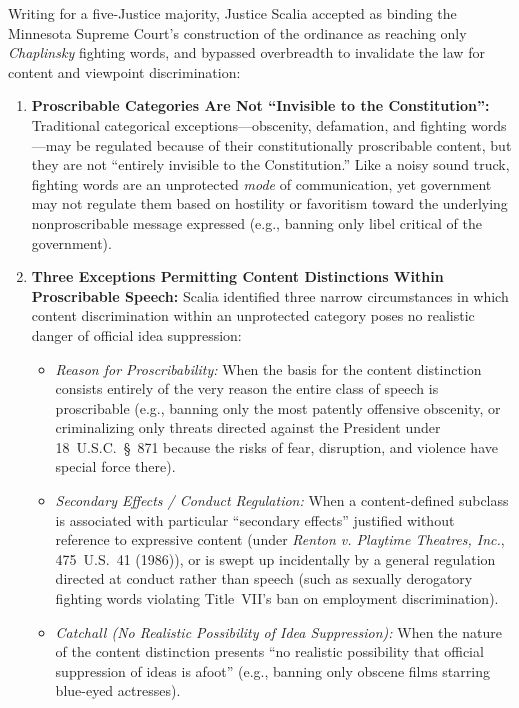 \documentclass[12pt]{article}
\begin{document}
Writing for a five-Justice majority, Justice Scalia accepted as binding the Minnesota Supreme Court's construction of the ordinance as reaching only \textit{Chaplinsky} fighting words, and bypassed overbreadth to invalidate the law for content and viewpoint discrimination:
\begin{enumerate}
  \item \textbf{Proscribable Categories Are Not ``Invisible to the Constitution'':} Traditional categorical exceptions---obscenity, defamation, and fighting words---may be regulated because of their constitutionally proscribable content, but they are not ``entirely invisible to the Constitution.'' Like a noisy sound truck, fighting words are an unprotected \textit{mode} of communication, yet government may not regulate them based on hostility or favoritism toward the underlying nonproscribable message expressed (e.g., banning only libel critical of the government).
  \item \textbf{Three Exceptions Permitting Content Distinctions Within Proscribable Speech:} Scalia identified three narrow circumstances in which content discrimination within an unprotected category poses no realistic danger of official idea suppression:
  \begin{itemize}
    \item \textit{Reason for Proscribability:} When the basis for the content distinction consists entirely of the very reason the entire class of speech is proscribable (e.g., banning only the most patently offensive obscenity, or criminalizing only threats directed against the President under 18~U.S.C.~\S~871 because the risks of fear, disruption, and violence have special force there).
    \item \textit{Secondary Effects / Conduct Regulation:} When a content-defined subclass is associated with particular ``secondary effects'' justified without reference to expressive content (under \textit{Renton v. Playtime Theatres, Inc.}, 475~U.S.~41 (1986)), or is swept up incidentally by a general regulation directed at conduct rather than speech (such as sexually derogatory fighting words violating Title~VII's ban on employment discrimination).
    \item \textit{Catchall (No Realistic Possibility of Idea Suppression):} When the nature of the content distinction presents ``no realistic possibility that official suppression of ideas is afoot'' (e.g., banning only obscene films starring blue-eyed actresses).
  \end{itemize}

\end{enumerate}
\end{document}
